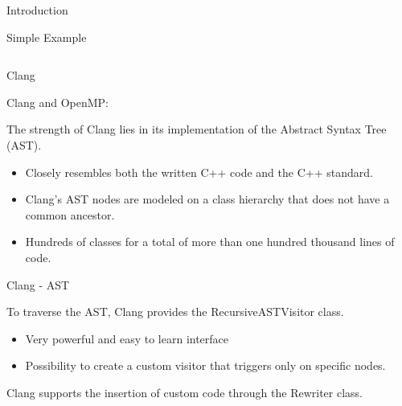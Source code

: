 \documentclass[xcolor=dvipsnames]{beamer}
\begin{document}
\begin{section}{Introduction}
\begin{frame}[fragile]{\hskip 0.3cm Simple Example}
\begin{columns}
\begin{column}{6.5cm}
\end{column}

\end{columns}

\end{frame}















\begin{frame}{\hskip 0.3cm Clang}

Clang and OpenMP:

The strength of Clang lies in its implementation of the Abstract Syntax Tree (AST).
\begin{itemize}

\item Closely resembles both the written C++ code and the C++ standard.

\item Clang’s AST nodes are modeled on a class hierarchy that does not have a common ancestor.

\item Hundreds of classes for a total of more than one hundred thousand lines of code.

\end{itemize}
\end{frame}
















\begin{frame}{\hskip 0.3cm Clang - AST}

To traverse the AST, Clang provides the RecursiveASTVisitor class.
\begin{itemize}

\item Very powerful and easy to learn interface

\item Possibility to create a custom visitor that triggers only on specific nodes.


\end{itemize}

Clang supports the insertion of custom code through the Rewriter class.
\begin{itemize}


\end{itemize}
\end{frame}
\end{section}
\end{document}
